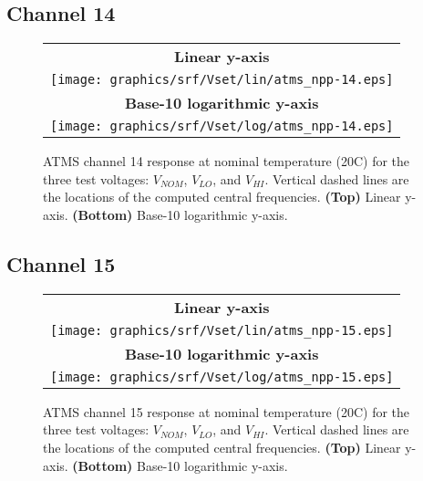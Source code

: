 \subsection{Channel 14}
\begin{figure}[H]
  \label{fig:Vset.ch14_response}
  \centering
  \begin{tabular}{c}
    \hspace{0.75cm}\sffamily\textbf{Linear y-axis} \\
    \texttt{[image: graphics/srf/Vset/lin/atms\_npp-14.eps]} \\
    \hspace{0.75cm}\sffamily\textbf{Base-10 logarithmic y-axis} \\
    \texttt{[image: graphics/srf/Vset/log/atms\_npp-14.eps]}
  \end{tabular}
  \caption{ATMS channel 14 response at nominal temperature (20\textdegree{}C) for the three test voltages: $V_{NOM}$, $V_{LO}$, and $V_{HI}$. Vertical dashed lines are the locations of the computed central frequencies. \textbf{(Top)} Linear y-axis. \textbf{(Bottom)} Base-10 logarithmic y-axis.}
\end{figure}

\subsection{Channel 15}
\begin{figure}[H]
  \label{fig:Vset.ch15_response}
  \centering
  \begin{tabular}{c}
    \hspace{0.75cm}\sffamily\textbf{Linear y-axis} \\
    \texttt{[image: graphics/srf/Vset/lin/atms\_npp-15.eps]} \\
    \hspace{0.75cm}\sffamily\textbf{Base-10 logarithmic y-axis} \\
    \texttt{[image: graphics/srf/Vset/log/atms\_npp-15.eps]}
  \end{tabular}
  \caption{ATMS channel 15 response at nominal temperature (20\textdegree{}C) for the three test voltages: $V_{NOM}$, $V_{LO}$, and $V_{HI}$. Vertical dashed lines are the locations of the computed central frequencies. \textbf{(Top)} Linear y-axis. \textbf{(Bottom)} Base-10 logarithmic y-axis.}
\end{figure}

